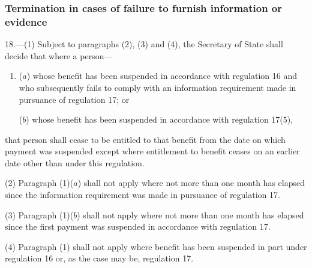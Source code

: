 \documentclass[12pt,a4paper]{article}
\begin{document}

\subsubsection[18. Termination in cases of failure to furnish information or evidence]{Termination in cases of failure to furnish information or evidence}

18.—(1) Subject to paragraphs (2), (3) and (4), the Secretary of State shall decide that where a person—
\begin{enumerate}\item[]
($a$) whose benefit has been suspended in accordance with regulation 16 and who subsequently fails to comply with an information requirement made in pursuance of regulation 17; or

($b$) whose benefit has been suspended in accordance with regulation 17(5),
\end{enumerate}
that person shall cease to be entitled to that benefit from the date on which payment was suspended except where entitlement to benefit ceases on an earlier date other than under this regulation.

(2) Paragraph (1)($a$) shall not apply where not more than one month has elapsed since the information requirement was made in pursuance of regulation 17.

(3) Paragraph (1)($b$) shall not apply where not more than one month has elapsed since the first payment was suspended in accordance with regulation 17.

(4) Paragraph (1) shall not apply where benefit has been suspended in part under regulation 16 or, as the case may be, regulation 17.
\end{document}
